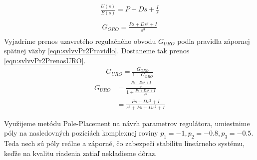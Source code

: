 \documentclass[../main.tex]{subfiles}
\begin{document}
	\begin{equation}
		\begin{aligned}
		\frac{U(s)}{E(s)} = P + Ds + \frac{I}{s} \\
		\end{aligned}
		\label{eqn:svlvvPr2PIDPrenos}
	\end{equation}
	\begin{equation}
		\begin{aligned}
		G_{ORO} = \frac{Ps + Ds^2 + I}{s^3} \\
		\end{aligned}
		\label{eqn:svlvvPr2PIDPrenosORO}
	\end{equation}
		Vyjadríme prenos uzavretého regulačného obvodu $G_{URO}$ podľa pravidla zápornej spätnej väzby \cref{eqn:svlvvPr2Pravidlo}. Dostaneme tak prenos \cref{eqn:svlvvPr2PrenosURO}.
	\begin{equation}
		\begin{aligned}
		G_{URO} = \frac{G_{ORO}}{1 + G_{ORO}}
		\end{aligned}
		\label{eqn:svlvvPr2Pravidlo}
	\end{equation}
	\begin{equation}
		\begin{aligned}
		G_{URO} &= \frac{\frac{Ps + Ds^2 + I}{s^3}}{1 + \frac{Ps + Ds^2 + I}{s^3}}  \\
		&= \frac{Ps + Ds^2 + I}{s^3 + Ps + Ds^2 +I}
		\end{aligned}
		\label{eqn:svlvvPr2PrenosURO}
	\end{equation}
	
	Využijeme metódu Pole-Placement na návrh parametrov regulátora, umiestnime póly na nasledovných pozíciách komplexnej roviny $p_1 = -1, p_2 = -0.8, p_3 = -0.5$. Teda nech sú póly reálne a záporné, čo zabezpečí stabilitu lineárneho systému, keďže na kvalitu riadenia zatiaľ nekladieme dôraz.
	
\end{document}
